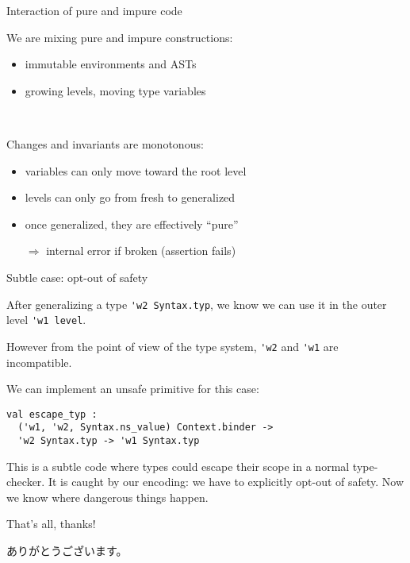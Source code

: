 \documentclass{beamer}          %
\begin{document}
\begin{frame}[fragile]{Interaction of pure and impure code}

  We are mixing pure and impure constructions:
  \begin{itemize}
    \item immutable environments and ASTs
    \item growing levels, moving type variables
  \end{itemize}

  \pause ~\

  Changes and invariants are monotonous:
  \begin{itemize}
    \item variables can only move toward the root level
    \item levels can only go from fresh to generalized
    \item once generalized, they are effectively ``pure''
    \item[$\Rightarrow$] internal error if broken (assertion fails)
  \end{itemize}

\end{frame}

\begin{frame}[fragile]{Subtle case: opt-out of safety}

  After generalizing a type \lstinline{'w2 Syntax.typ}, we know we can use it in the outer level \lstinline{'w1 level}.

  However from the point of view of the type system, \lstinline{'w2} and \lstinline{'w1} are incompatible.

We can implement an unsafe primitive for this case:
\begin{lstlisting}
val escape_typ :
  ('w1, 'w2, Syntax.ns_value) Context.binder ->
  'w2 Syntax.typ -> 'w1 Syntax.typ
\end{lstlisting}

This is a subtle code where types could escape their scope in a normal type-checker. It is caught by our encoding: we have to explicitly opt-out of safety. Now we know where dangerous things happen.

\end{frame}

\begin{frame}{That's all, thanks!}

  ありがとうございます。

\end{frame}
\end{document}
